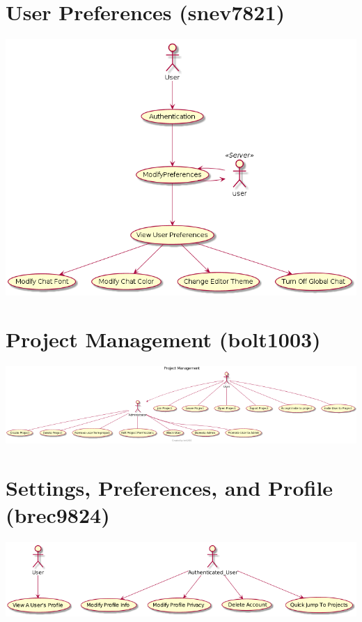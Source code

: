 \documentclass[11pt]{report}
\begin{document}
    \section{User Preferences (snev7821)}
        \includegraphics[width=\textwidth]{diagrams/usecase-preferences}
    \section{Project Management (bolt1003)}
        \includegraphics[width=\textwidth]{diagrams/usecase-projectmanagement}
    \section{Settings, Preferences, and Profile (brec9824)}
        \includegraphics[width=\textwidth]{diagrams/usecase-settingsmanager}
\end{document}
